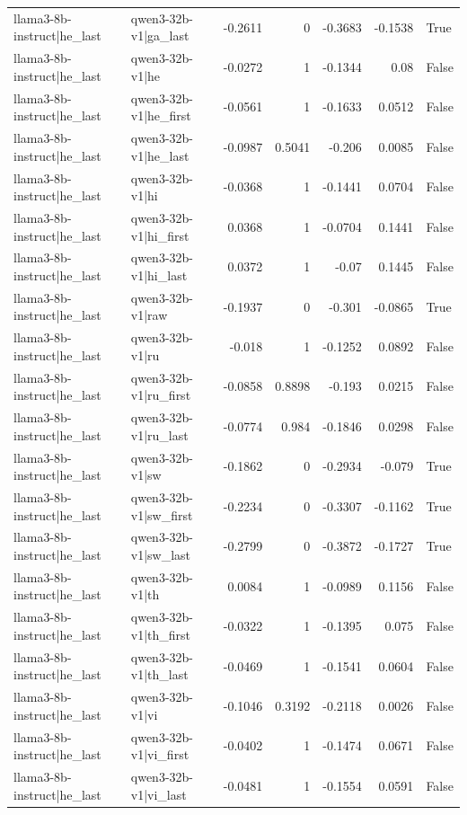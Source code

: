 \begin{table}
\begin{tabular}{l l r r r r l}
llama3-8b-instruct|he_last & qwen3-32b-v1|ga_last & -0.2611 & 0 & -0.3683 & -0.1538 & True \\
llama3-8b-instruct|he_last & qwen3-32b-v1|he & -0.0272 & 1 & -0.1344 & 0.08 & False \\
llama3-8b-instruct|he_last & qwen3-32b-v1|he_first & -0.0561 & 1 & -0.1633 & 0.0512 & False \\
llama3-8b-instruct|he_last & qwen3-32b-v1|he_last & -0.0987 & 0.5041 & -0.206 & 0.0085 & False \\
llama3-8b-instruct|he_last & qwen3-32b-v1|hi & -0.0368 & 1 & -0.1441 & 0.0704 & False \\
llama3-8b-instruct|he_last & qwen3-32b-v1|hi_first & 0.0368 & 1 & -0.0704 & 0.1441 & False \\
llama3-8b-instruct|he_last & qwen3-32b-v1|hi_last & 0.0372 & 1 & -0.07 & 0.1445 & False \\
llama3-8b-instruct|he_last & qwen3-32b-v1|raw & -0.1937 & 0 & -0.301 & -0.0865 & True \\
llama3-8b-instruct|he_last & qwen3-32b-v1|ru & -0.018 & 1 & -0.1252 & 0.0892 & False \\
llama3-8b-instruct|he_last & qwen3-32b-v1|ru_first & -0.0858 & 0.8898 & -0.193 & 0.0215 & False \\
llama3-8b-instruct|he_last & qwen3-32b-v1|ru_last & -0.0774 & 0.984 & -0.1846 & 0.0298 & False \\
llama3-8b-instruct|he_last & qwen3-32b-v1|sw & -0.1862 & 0 & -0.2934 & -0.079 & True \\
llama3-8b-instruct|he_last & qwen3-32b-v1|sw_first & -0.2234 & 0 & -0.3307 & -0.1162 & True \\
llama3-8b-instruct|he_last & qwen3-32b-v1|sw_last & -0.2799 & 0 & -0.3872 & -0.1727 & True \\
llama3-8b-instruct|he_last & qwen3-32b-v1|th & 0.0084 & 1 & -0.0989 & 0.1156 & False \\
llama3-8b-instruct|he_last & qwen3-32b-v1|th_first & -0.0322 & 1 & -0.1395 & 0.075 & False \\
llama3-8b-instruct|he_last & qwen3-32b-v1|th_last & -0.0469 & 1 & -0.1541 & 0.0604 & False \\
llama3-8b-instruct|he_last & qwen3-32b-v1|vi & -0.1046 & 0.3192 & -0.2118 & 0.0026 & False \\
llama3-8b-instruct|he_last & qwen3-32b-v1|vi_first & -0.0402 & 1 & -0.1474 & 0.0671 & False \\
llama3-8b-instruct|he_last & qwen3-32b-v1|vi_last & -0.0481 & 1 & -0.1554 & 0.0591 & False \\

\end{tabular}
\end{table}

